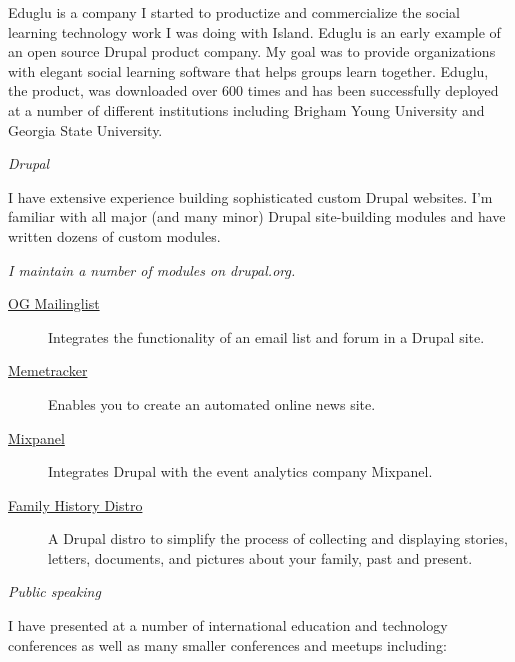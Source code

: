 \documentclass[11pt]{article}
\begin{document}
\bigskip


\noindent Eduglu is a company I started to productize and commercialize the social learning technology work I was doing with Island. Eduglu is an early example of an open source Drupal product company. My goal was to provide organizations with elegant social learning software that helps groups learn together. Eduglu, the product, was downloaded over 600 times and has been successfully deployed at a number of different institutions including Brigham Young University and Georgia State University.

\bigskip



\medskip

\noindent\emph{Drupal \vspace{0.15in}}

\noindent I have extensive experience building sophisticated custom Drupal websites. I'm familiar with all major (and many minor) Drupal site-building modules and have written dozens of custom modules.

\bigskip

\noindent \emph{I maintain a number of modules on drupal.org.}

\begin{description}
  \item[\href{http://drupal.org/project/og_mailinglist}{OG Mailinglist}] Integrates the functionality of an email list and forum in a Drupal site.
  \item[\href{http://drupal.org/project/memetracker}{Memetracker}] Enables you to create an automated online news site.
  \item[\href{http://drupal.org/project/mixpanel}{Mixpanel}] Integrates Drupal with the event analytics company Mixpanel.
  \item[\href{http://drupal.org/project/family_history}{Family History Distro}] A Drupal distro to simplify the process of collecting and displaying stories, letters, documents, and pictures about your family, past and present.
\end{description}

\medskip

\noindent\emph{Public speaking}

\medskip

\noindent I have presented at a number of international education and technology conferences as well as many smaller conferences and meetups including:
\end{document}

